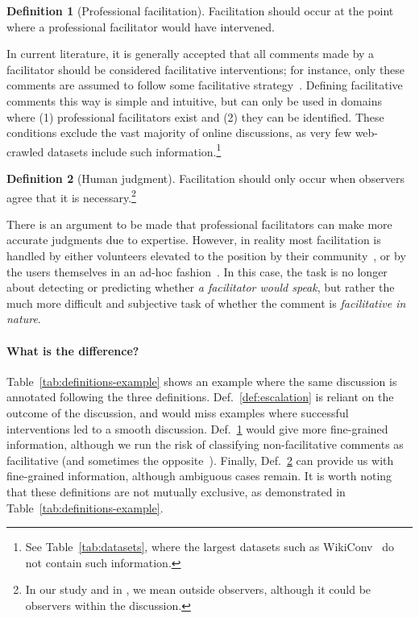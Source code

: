 \documentclass[11pt]{article}
\theoremstyle{definition}
\newtheorem{definition}{Definition}
\theoremstyle{plain}
\begin{document}
\begin{definition}[Professional facilitation]
	\label{def:facilitator}
	Facilitation should occur at the point where a professional facilitator would have intervened. 
\end{definition}

In current literature, it is generally accepted that all comments made by a facilitator should be considered facilitative interventions; for instance, only these comments are assumed to follow some facilitative strategy~\citep{falk-etal-2021-predicting, chen-etal-2025-whow, schroeder-etal-2024-fora}. Defining facilitative comments this way is simple and intuitive, but can only be used in domains where (1) professional facilitators exist and (2) they can be identified. These conditions exclude the vast majority of online discussions, as very few web-crawled datasets include such information.\footnote{See Table~\ref{tab:datasets}, where the largest datasets such as WikiConv~\citep{wikiconv} do not contain such information.}

\begin{definition}[Human judgment]
	\label{def:facilitative}
	Facilitation should only occur when observers 
	agree that it is necessary.\footnote{In our study and in \citet{schaffner_community_guidelines}, we mean outside observers, although it could be observers within the discussion.}
\end{definition}

There is an argument to be made that professional facilitators can make more accurate judgments due to expertise. However, in reality most facilitation is handled by either volunteers elevated to the position by their community~\cite{schaffner_community_guidelines}, or by the users themselves in an ad-hoc fashion~\cite{umod}. In this case, the task is no longer about detecting or predicting whether \emph{a facilitator would speak}, but rather the much more difficult and subjective task of whether the comment is \emph{facilitative in nature}.

\paragraph{What is the difference?} Table~\ref{tab:definitions-example} shows an example where the same discussion is annotated following the three definitions. Def.~\ref{def:escalation} is reliant on the outcome of the discussion, and would miss examples where successful interventions led to a smooth discussion. Def.~\ref{def:facilitator} would give more fine-grained information, although we run the risk of classifying non-facilitative comments as facilitative (and sometimes the opposite~\cite{umod}). Finally, Def.~\ref{def:facilitative} can provide us with fine-grained information, although ambiguous cases remain. It is worth noting that these definitions are not mutually exclusive, as demonstrated in Table~\ref{tab:definitions-example}.
\end{document}

